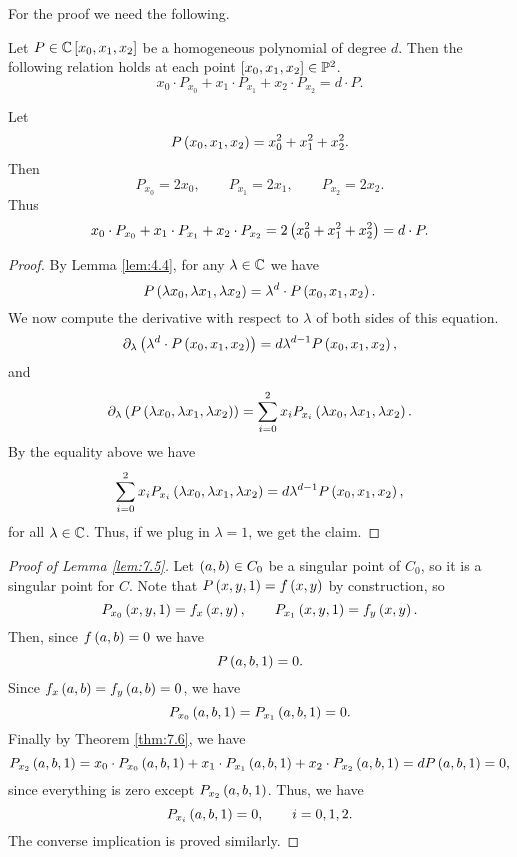 For the proof we need the following.

\begin{theorem}
\label{thm:7.6}
Let $ P \in \C\sb{x_0, x_1, x_2} $ be a homogeneous polynomial of degree $ d $. Then the following relation holds at each point $ \sb{x_0, x_1, x_2} \in \P^2 $.
$$ x_0 \cdot P_{x_0} + x_1 \cdot P_{x_1} + x_2 \cdot P_{x_2} = d \cdot P. $$
\end{theorem}

\begin{example*}
Let
$$ P\rb{x_0, x_1, x_2} = x_0^2 + x_1^2 + x_2^2. $$
Then
$$ P_{x_0} = 2x_0, \qquad P_{x_1} = 2x_1, \qquad P_{x_2} = 2x_2. $$
Thus
$$ x_0 \cdot P_{x_0} + x_1 \cdot P_{x_1} + x_2 \cdot P_{x_2} = 2\rb{x_0^2 + x_1^2 + x_2^2} = d \cdot P. $$
\end{example*}

\begin{proof}
By Lemma \ref{lem:4.4}, for any $ \lambda \in \C $ we have
$$ P\rb{\lambda x_0, \lambda x_1, \lambda x_2} = \lambda^d \cdot P\rb{x_0, x_1, x_2}. $$
We now compute the derivative with respect to $ \lambda $ of both sides of this equation.
$$ \partial_\lambda\rb{\lambda^d \cdot P\rb{x_0, x_1, x_2}} = d\lambda^{d - 1}P\rb{x_0, x_1, x_2}, $$
and
$$ \partial_\lambda\rb{P\rb{\lambda x_0, \lambda x_1, \lambda x_2}} = \sum_{i = 0}^2 x_iP_{x_i}\rb{\lambda x_0, \lambda x_1, \lambda x_2}. $$
By the equality above we have
$$ \sum_{i = 0}^2 x_iP_{x_i}\rb{\lambda x_0, \lambda x_1, \lambda x_2} = d\lambda^{d - 1}P\rb{x_0, x_1, x_2}, $$
for all $ \lambda \in \C $. Thus, if we plug in $ \lambda = 1 $, we get the claim.
\end{proof}

\begin{proof}[Proof of Lemma \ref{lem:7.5}]
Let $ \rb{a, b} \in C_0 $ be a singular point of $ C_0 $, so it is a singular point for $ C $. Note that $ P\rb{x, y, 1} = f\rb{x, y} $ by construction, so
$$ P_{x_0}\rb{x, y, 1} = f_x\rb{x, y}, \qquad P_{x_1}\rb{x, y, 1} = f_y\rb{x, y}. $$
Then, since $ f\rb{a, b} = 0 $ we have
$$ P\rb{a, b, 1} = 0. $$
Since $ f_x\rb{a, b} = f_y\rb{a, b} = 0 $, we have
$$ P_{x_0}\rb{a, b, 1} = P_{x_1}\rb{a, b, 1} = 0. $$
Finally by Theorem \ref{thm:7.6}, we have
$$ P_{x_2}\rb{a, b, 1} = x_0 \cdot P_{x_0}\rb{a, b, 1} + x_1 \cdot P_{x_1}\rb{a, b, 1} + x_2 \cdot P_{x_2}\rb{a, b, 1} = dP\rb{a, b, 1} = 0, $$
since everything is zero except $ P_{x_2}\rb{a, b, 1} $. Thus, we have
$$ P_{x_i}\rb{a, b, 1} = 0, \qquad i = 0, 1, 2. $$
The converse implication is proved similarly.
\end{proof}

